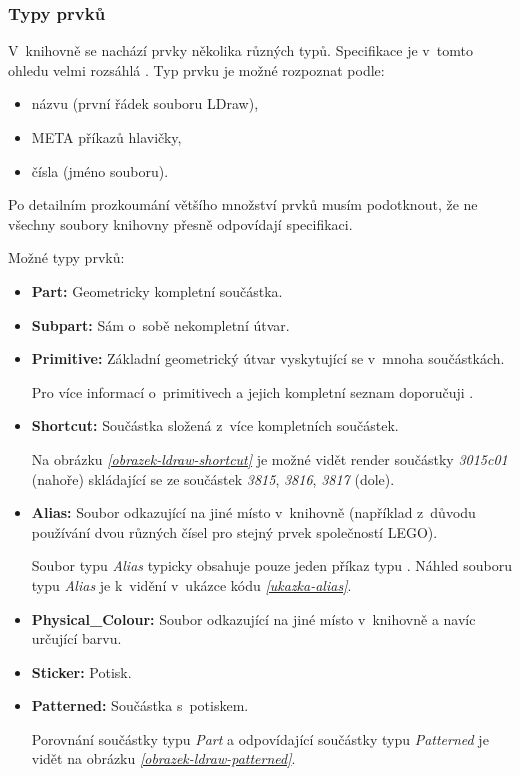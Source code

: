     \subsubsection*{Typy prvků}\label{ldraw-typy-soucastek}
    V~knihovně se nachází prvky několika různých typů. Specifikace je v~tomto ohledu velmi rozsáhlá \autocite{ldraw:header:specification}\autocite{ldraw:sticker:specification}. Typ prvku je možné rozpoznat podle: 
    \begin{itemize}
        \item názvu (první řádek souboru LDraw),
        \item META příkazů hlavičky,
        \item čísla (jméno souboru).
    \end{itemize}
    
    Po detailním prozkoumání většího množství prvků musím podotknout, že ne všechny soubory knihovny přesně odpovídají specifikaci. 

    Možné typy prvků:
    
    \begin{itemize}
        \item \textbf{Part:} Geometricky kompletní součástka.
        \item \textbf{Subpart:} Sám o~sobě nekompletní útvar.
        \item \textbf{Primitive:} Základní geometrický útvar vyskytující se v~mnoha součástkách.

        Pro více informací o~primitivech a jejich kompletní seznam doporučuji \autocite{ldraw:primitives}.

        \item \textbf{Shortcut:} Součástka složená z~více kompletních součástek.

        Na obrázku \emph{\ref{obrazek-ldraw-shortcut}} je možné vidět render součástky \textit{3015c01} (nahoře) skládající se ze součástek \textit{3815}, \textit{3816}, \textit{3817} (dole).

        \item \textbf{Alias:} Soubor odkazující na jiné místo v~knihovně (například z~důvodu používání dvou různých čísel pro stejný prvek společností LEGO). 
        
        Soubor typu \textit{Alias} typicky obsahuje pouze jeden příkaz typu . Náhled souboru typu \textit{Alias} je k~vidění v~ukázce kódu \emph{\ref{ukazka-alias}}.

        \item \textbf{Physical\_Colour:} Soubor odkazující na jiné místo v~knihovně a navíc určující barvu.
        \item \textbf{Sticker:} Potisk.
        \item \textbf{Patterned:} Součástka s~potiskem.
        
        Porovnání součástky typu \textit{Part} a odpovídající součástky typu \textit{Patterned} je vidět na obrázku \emph{\ref{obrazek-ldraw-patterned}}.
        
    \end{itemize}
   
